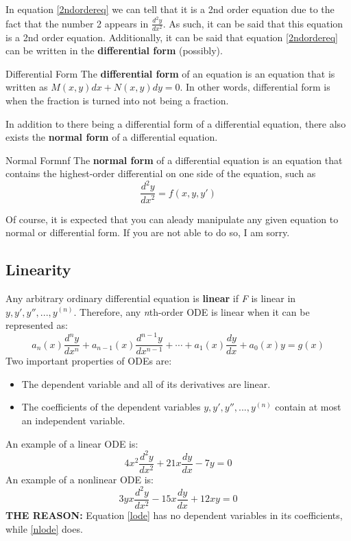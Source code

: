 \documentclass[letter, 11pt]{book}
\begin{document}
In equation \eqref{2ndordereq} we can tell that it is a 2nd order equation due to the fact that the number 2 appears in
$\frac{d^2y}{dx^2}$. As such, it can be said that this equation is a 2nd order equation. 
Additionally, it can be said that equation \eqref{2ndordereq} can be  written in the \textbf{differential form} (possibly).
\begin{definition}{Differential Form}{}
	The \textbf{differential form} of an equation is an equation that is written as $M(x, y)dx + N(x, y)dy = 0$.	
	In other words, differential form is when the fraction is turned into not being a fraction.
\end{definition}

In addition to there being a differential form of a differential equation, there also exists the \textbf{normal form} of a differential equation.
\begin{definition}{Normal Form}{nf}
	The \textbf{normal form} of a differential equation is an equation that contains the highest-order differential on one side
	of the equation, such as
	\begin{equation}
		\frac{d^2y}{dx^2} = f(x, y, y')
	\end{equation}
\end{definition}

Of course, it is expected that you can aleady manipulate any given equation to normal or differential form. If you are
not able to do so, I am sorry.

\subsection{Linearity}


Any arbitrary ordinary differential equation is \textbf{linear} if \textit{F} is linear in $y,y',y'',...,y^{(n)}$.
Therefore, any \textit{n}th-order ODE is linear when it can be represented as:
\begin{equation}
	a_n(x)\frac{d^ny}{dx^n}+a_{n-1}(x)\frac{d^{n-1}y}{dx^{n-1}}+\dotsi+a_1(x)\frac{dy}{dx}+a_0(x)y=g(x)
\end{equation}
Two important properties of ODEs are:
\begin{itemize}
	\item{The dependent variable and all of its derivatives are linear.}
	\item{The coefficients of the dependent variables $y, y', y'',...,y^{(n)}$ contain at most an independent variable.}
\end{itemize}
An example of a linear ODE is:
\begin{equation}\label{lode}
	4x^2\frac{d^2y}{dx^2}+21x\frac{dy}{dx}-7y=0
\end{equation}
An example of a nonlinear ODE is:
\begin{equation}\label{nlode}
	3yx\frac{d^2y}{dx^2}-15x\frac{dy}{dx}+12xy=0
\end{equation}
\textbf{THE REASON:} Equation \eqref{lode} has no dependent variables in its coefficients, while \eqref{nlode} does.
\end{document}

